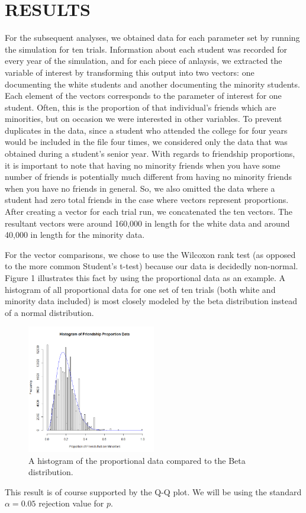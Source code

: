 
\section{RESULTS}
\label{sec:results}

For the subsequent analyses, we obtained data for each parameter set by running the simulation for ten trials. Information about each student was recorded for every year of the 
simulation, and for each piece of anlaysis, we extracted the variable of interest by transforming this output into two vectors: one documenting the white students and another documenting the minority students. Each element of the vectors corresponds to the parameter of interest for one student. Often, this is the proportion of that individual's friends which are 
minorities, but on occasion we were interested in other variables. To prevent duplicates in the data, since a student who attended the college for four years would be included in the file four 
times, we considered only the data that was obtained during a student's senior year. With regards to friendship proportions, it is important to note 
that having no minority friends when you have some number of friends is potentially much different from having no 
minority friends when you have no friends in general. So, we also omitted the data where a student had zero total friends in the case where vectors represent proportions.
After creating a vector for each trial run, we concatenated the ten vectors. The resultant vectors were around 160,000 in 
length for the white data and around 40,000 in length for the minority data.

For the vector comparisons, we chose to use the Wilcoxon rank test (as opposed to the more common Student's t-test) because our data is decidedly non-normal. Figure 1 illustrates this 
fact by using the proportional data as an example. A histogram of all proportional data for one set of ten trials (both white and minority data included) is most closely modeled by the beta distribution instead of a normal distribution.
\begin{figure}[h]
  \centering
    \includegraphics[width=0.5\textwidth]{histogramProportionData.png}
      \caption{A histogram of the proportional data compared to the Beta distribution.}
\end{figure}
This result is of course supported by the Q-Q plot. We will be using the standard $\alpha=0.05$ rejection value for $p$.

